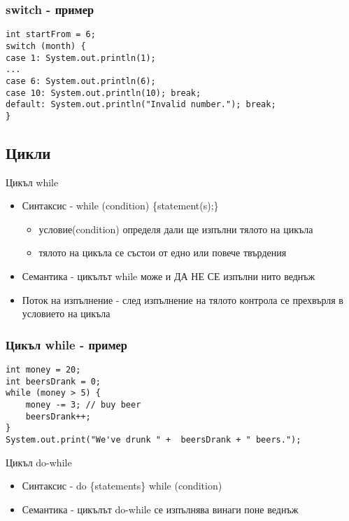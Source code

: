 \documentclass{beamer}
\begin{document}
\begin{frame}[fragile]
  \frametitle{switch - пример}
  \transdissolve
\begin{lstlisting}
int startFrom = 6;
switch (month) {
case 1: System.out.println(1);
...
case 6: System.out.println(6);
case 10: System.out.println(10); break;
default: System.out.println("Invalid number."); break;
}
\end{lstlisting}
\end{frame}

\subsection{Цикли}

\begin{frame}{Цикъл while}
  \transdissolve
  \begin{itemize}
  \item Синтаксис - while (condition) \{statement(s);\}
    \begin{itemize}
      \item условие(condition) определя дали ще изпълни тялото на цикъла
      \item тялото на цикъла се състои от едно или повече твърдения
    \end{itemize}

  \item Семантика - цикълът while може и ДА НЕ СЕ изпълни нито веднъж
  \item Поток на изпълнение - след изпълнение на тялото контрола се
    прехвърля в условието на цикъла
  \end{itemize}
\end{frame}

\begin{frame}[fragile]
  \frametitle{Цикъл while - пример}
  \transdissolve
\begin{lstlisting}
int money = 20;
int beersDrank = 0;
while (money > 5) {
    money -= 3; // buy beer
    beersDrank++;
}
System.out.print("We've drunk " +  beersDrank + " beers.");
\end{lstlisting}
\end{frame}

\begin{frame}{Цикъл do-while}
  \transdissolve
  \begin{itemize}
  \item Синтаксис - do \{statements\} while (condition)
  \item Семантика - цикълът do-while се изпълнява винаги поне веднъж
  \end{itemize}
\end{frame}
\end{document}
